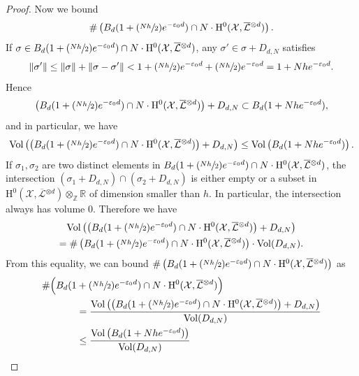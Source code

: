 \documentclass[11pt]{article}
\numberwithin{equation}{section}
\newcommand{\Psfrac}[2]{(\sfrac{#1}{#2})}
\theoremstyle{plain}
\theoremstyle{definition}
\newcommand{\ho}{\mathrm{H}}
\newcommand{\X}{\mathcal{X}}
\newcommand{\Li}{\overline{\mathcal{L}}{}}
\begin{document}
\begin{proof}[Proof]
Now we bound
\[
\#\left(B_d(1+\Psfrac{Nh}{2}e^{-\varepsilon_0 d}) \cap N\cdot \ho^0(\X,\Li^{\otimes d}) \right).
\]
If $\sigma\in B_d(1+\Psfrac{Nh}{2}e^{-\varepsilon_0 d}) \cap N\cdot \ho^0(\X,\Li^{\otimes d})$, any $\sigma'\in \sigma+D_{d,N}$ satisfies
\[
\lVert \sigma' \rVert \leq \lVert \sigma\rVert +\lVert \sigma-\sigma'\rVert <1+\Psfrac{Nh}{2}e^{-\varepsilon_0 d}+\Psfrac{Nh}{2}e^{-\varepsilon_0 d}=1+Nhe^{-\varepsilon_0 d}.
\]
Hence
\[
\left(B_d(1+\Psfrac{Nh}{2}e^{-\varepsilon_0 d}) \cap N\cdot \ho^0(\X,\Li^{\otimes d}) \right)+D_{d,N}\subset B_d(1+Nhe^{-\varepsilon_0 d}),
\]
and in particular, we have
\[
\mathrm{Vol}\left(\left(B_d(1+\Psfrac{Nh}{2}e^{-\varepsilon_0 d}) \cap N\cdot \ho^0(\X,\Li^{\otimes d}) \right)+D_{d,N} \right)\leq \mathrm{Vol} \left(B_d(1+Nhe^{-\varepsilon_0 d}) \right).
\]
If $\sigma_1,\sigma_2$ are two distinct elements in $B_d(1+\Psfrac{Nh}{2}e^{-\varepsilon_0 d}) \cap N\cdot \ho^0(\X,\Li^{\otimes d})$, the intersection $(\sigma_1+D_{d,N})\cap (\sigma_2+D_{d,N})$ is either empty or a subset in $\ho^0(\X,\Li^{\otimes d})\otimes_{\mathbb{Z}}\mathbb{R}$ of dimension smaller than $h$. In particular, the intersection always has volume $0$. Therefore we have
\begin{multline*}
\mathrm{Vol}\left(\left(B_d(1+\Psfrac{Nh}{2}e^{-\varepsilon_0 d}) \cap N\cdot \ho^0(\X,\Li^{\otimes d}) \right)+D_{d,N} \right) \\
=\# \left(B_d(1+\Psfrac{Nh}{2}e^{-\varepsilon_0 d}) \cap N\cdot \ho^0(\X,\Li^{\otimes d}) \right)\cdot \mathrm{Vol}(D_{d,N}).
\end{multline*}
From this equality, we can bound $\# \left(B_d(1+\Psfrac{Nh}{2}e^{-\varepsilon_0 d}) \cap N\cdot \ho^0(\X,\Li^{\otimes d}) \right)$ as
\begin{align*}
\# \Bigl(B_d(1&+\Psfrac{Nh}{2}e^{-\varepsilon_0 d}) \cap N\cdot \ho^0(\X,\Li^{\otimes d}) \Bigr)\\
&=\frac{\mathrm{Vol}\left(\left(B_d(1+\Psfrac{Nh}{2}e^{-\varepsilon_0 d}) \cap N\cdot \ho^0(\X,\Li^{\otimes d}) \right)+D_{d,N} \right)}{\mathrm{Vol}(D_{d,N})}\\
&\leq \frac{\mathrm{Vol} \left(B_d(1+Nhe^{-\varepsilon_0 d}) \right)}{\mathrm{Vol}(D_{d,N})}
\end{align*}


\end{proof}
\end{document}
